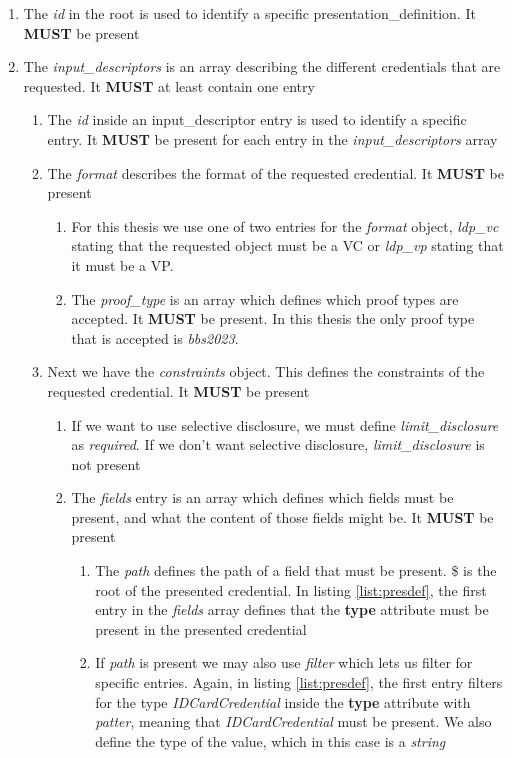 \documentclass[
	a4paper               %
	,BCOR=0mm            %
	,bibliography=totoc   %
	,listof=totoc         %
	,monolingual
	,twoside=false
]{bfhthesis}              %
\begin{document}
\begin{enumerate}
	\item The \textit{id} in the root is used to identify a specific presentation\_definition. It \textbf{MUST} be present
	\item The \textit{input\_descriptors} is an array describing the different credentials that are requested. It \textbf{MUST} at least contain one entry
	\begin{enumerate}
		\item The \textit{id} inside an input\_descriptor entry is used to identify a specific entry. It \textbf{MUST} be present for each entry in the \textit{input\_descriptors} array
		\item The \textit{format} describes the format of the requested credential. It \textbf{MUST} be present
		\begin{enumerate}
			\item For this thesis we use one of two entries for the \textit{format} object, \textit{ldp\_vc} stating that the requested object must be a VC or \textit{ldp\_vp} stating that it must be a VP.
			\item The \textit{proof\_type} is an array which defines which proof types are accepted. It \textbf{MUST} be present. In this thesis the only proof type that is accepted is \textit{bbs2023}.
		\end{enumerate}
		\item Next we have the \textit{constraints} object. This defines the constraints of the requested credential. It \textbf{MUST} be present
		\begin{enumerate}
			\item If we want to use selective disclosure, we must define \textit{limit\_disclosure} as \textit{required}. If we don't want selective disclosure, \textit{limit\_disclosure} is not present
			\item The \textit{fields} entry is an array which defines which fields must be present, and what the content of those fields might be. It \textbf{MUST} be present
			\begin{enumerate}
				\item The \textit{path} defines the path of a field that must be present. \$ is the root of the presented credential. In listing \ref{list:presdef}, the first entry in the \textit{fields} array defines that the \textbf{type} attribute must be present in the presented credential
				\item If \textit{path} is present we may also use \textit{filter} which lets us filter for specific entries. Again, in listing \ref{list:presdef}, the first entry filters for the type \textit{IDCardCredential} inside the \textbf{type} attribute with \textit{patter}, meaning that \textit{IDCardCredential} must be present. We also define the type of the value, which in this case is a \textit{string}

\end{enumerate}
\end{enumerate}
\end{enumerate}
\end{enumerate}
\end{document}
